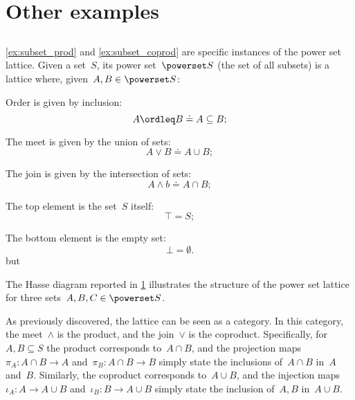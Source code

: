 \section{Other examples}

\subsection{}
\cref{ex:subset_prod} and \cref{ex:subset_coprod} are specific instances of the power set lattice. Given a set~$S$, its power set~$\powerset S$ (the set of all subsets) is a lattice where, given~$A,B\in \powerset S$:
\begin{compactitem}
  \item Order is given by inclusion:
  \begin{equation*}
    A\ordleq B \doteq A\subseteq B;
  \end{equation*}
  \item The meet is given by the union of sets:
  \begin{equation*}
    A\vee B \doteq A\cup B;
  \end{equation*}
  \item The join is given by the intersection of sets:
  \begin{equation*}
    A\wedge b \doteq A\cap B;
  \end{equation*}
  \item The top element is the set~$S$ itself:
  \begin{equation*}
    \top = S;
  \end{equation*}
  \item The bottom element is the empty set:
  \begin{equation*}
    \bot = \emptyset.
  \end{equation*}but
\end{compactitem}
The Hasse diagram reported in \cref{fig:prod_coprod_power} illustrates the structure of the power set lattice for three sets~$A,B,C\in \powerset S$.

\begin{figure}[h]
  \begin{center}
  \end{center}
  \caption{\label{fig:prod_coprod_power}}
\end{figure}
As previously discovered, the lattice can be seen as a category.
In this category, the meet~$\wedge$ is the product, and the join~$\vee$ is the coproduct.
Specifically, for~$A,B\subseteq S$ the product corresponds to~$A\cap B$, and the projection maps~$\pi_A\colon A\cap B\to A$ and~$\pi_B\colon A\cap B\to B$ simply state the inclusions of~$A\cap B$ in~$A$ and~$B$.
Similarly, the coproduct corresponds to~$A\cup B$, and the injection maps~$\iota_A\colon A\to A\cup B$ and~$\iota_B\colon B\to A\cup B$ simply state the inclusion of~$A,B$ in~$A\cup B$.

\subsubsection{}

